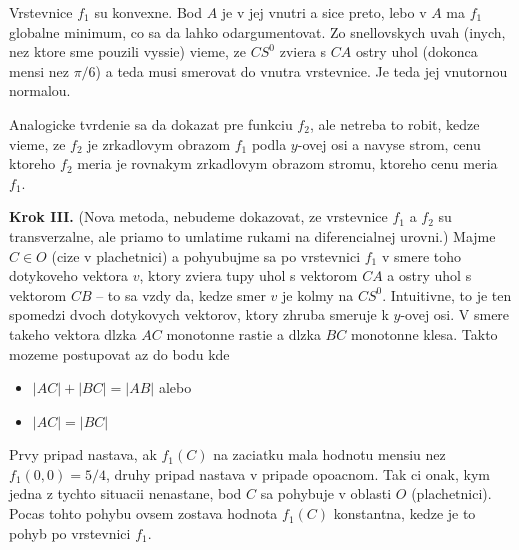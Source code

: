 \documentclass[12pt]{book}
\begin{document}
Vrstevnice $f_{1}$ su konvexne.
Bod $A$ je v jej vnutri a sice preto, lebo v $A$ ma $f_{1}$ globalne minimum,
    co sa da lahko odargumentovat.
Zo snellovskych uvah (inych, nez ktore sme pouzili vyssie) vieme, ze $CS^{0}$
    zviera s $CA$ ostry uhol (dokonca mensi nez $\pi/6$) a teda musi smerovat
    do vnutra vrstevnice.
Je teda jej vnutornou normalou.

Analogicke tvrdenie sa da dokazat pre funkciu $f_{2}$, ale netreba to robit,
    kedze vieme, ze $f_{2}$ je zrkadlovym obrazom $f_{1}$ podla $y$-ovej osi
    a navyse strom, cenu ktoreho $f_{2}$ meria je rovnakym zrkadlovym obrazom
    stromu, ktoreho cenu meria $f_{1}$.

{\bf Krok III.}
(Nova metoda, nebudeme dokazovat, ze vrstevnice $f_{1}$ a $f_{2}$ su
    transverzalne, ale priamo to umlatime rukami na diferencialnej urovni.)
Majme $C\in O$ (cize v plachetnici) a pohyubujme sa po vrstevnici $f_{1}$ v
    smere toho dotykoveho vektora $v$, ktory zviera tupy uhol s vektorom $CA$
    a ostry uhol s vektorom $CB$ -- to sa vzdy da, kedze smer $v$ je kolmy na
    $CS^{0}$.
Intuitivne, to je ten spomedzi dvoch dotykovych vektorov, ktory zhruba smeruje
    k $y$-ovej osi.
V smere takeho vektora dlzka $AC$ monotonne rastie a dlzka $BC$ monotonne
    klesa.
Takto mozeme postupovat az do bodu kde
    \begin{itemize}
        \item[(i)] $|AC| + |BC| = |AB|$ alebo
        \item[(ii)] $|AC| = |BC|$
    \end{itemize}
Prvy pripad nastava, ak $f_{1}(C)$ na zaciatku mala hodnotu mensiu nez
    $f_{1}(0,0) = 5/4$, druhy pripad nastava v pripade opoacnom.
Tak ci onak, kym jedna z tychto situacii nenastane, bod $C$ sa pohybuje v
    oblasti $O$ (plachetnici).
Pocas tohto pohybu ovsem zostava hodnota $f_{1}(C)$ konstantna, kedze je to
    pohyb po vrstevnici $f_{1}$.
\end{document}
